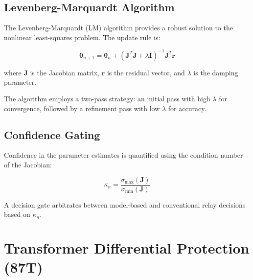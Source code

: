 \documentclass[12pt,a4paper]{article}
\begin{document}
\subsection{Levenberg-Marquardt Algorithm}
\label{subsec:lm}

The Levenberg-Marquardt (LM) algorithm provides a robust solution to the nonlinear least-squares problem. The update rule is:

\begin{equation}
\boldsymbol{\theta}_{n+1} = \boldsymbol{\theta}_n + (\mathbf{J}^T\mathbf{J} + \lambda \mathbf{I})^{-1} \mathbf{J}^T \mathbf{r}
\label{eq:lm}
\end{equation}

where $\mathbf{J}$ is the Jacobian matrix, $\mathbf{r}$ is the residual vector, and $\lambda$ is the damping parameter.

The algorithm employs a two-pass strategy: an initial pass with high $\lambda$ for convergence, followed by a refinement pass with low $\lambda$ for accuracy.

\subsection{Confidence Gating}
\label{subsec:confidence}

Confidence in the parameter estimates is quantified using the condition number of the Jacobian:

\begin{equation}
\kappa_n = \frac{\sigma_{\max}(\mathbf{J})}{\sigma_{\min}(\mathbf{J})}
\label{eq:condition}
\end{equation}

A decision gate arbitrates between model-based and conventional relay decisions based on $\kappa_n$.

\section{Transformer Differential Protection (87T)}
\label{sec:87t}

% 
\end{document}

